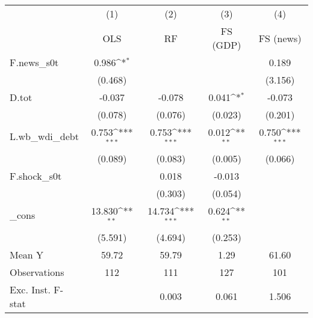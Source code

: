 {
\def\sym#1{\ifmmode^{#1}\else\(^{#1}\)\fi}
\begin{tabular}{l*{4}{c}}
\toprule
            &\multicolumn{1}{c}{(1)}&\multicolumn{1}{c}{(2)}&\multicolumn{1}{c}{(3)}&\multicolumn{1}{c}{(4)}\\
            &\multicolumn{1}{c}{OLS}&\multicolumn{1}{c}{RF}&\multicolumn{1}{c}{FS (GDP)}&\multicolumn{1}{c}{FS (news)}\\
\midrule
F.news\_s0t  &       0.986\sym{*}  &                     &                     &       0.189         \\
            &     (0.468)         &                     &                     &     (3.156)         \\
\addlinespace
D.tot       &      -0.037         &      -0.078         &       0.041\sym{*}  &      -0.073         \\
            &     (0.078)         &     (0.076)         &     (0.023)         &     (0.201)         \\
\addlinespace
L.wb\_wdi\_debt&       0.753\sym{***}&       0.753\sym{***}&       0.012\sym{**} &       0.750\sym{***}\\
            &     (0.089)         &     (0.083)         &     (0.005)         &     (0.066)         \\
\addlinespace
F.shock\_s0t &                     &       0.018         &      -0.013         &                     \\
            &                     &     (0.303)         &     (0.054)         &                     \\
\addlinespace
\_cons      &      13.830\sym{**} &      14.734\sym{***}&       0.624\sym{**} &                     \\
            &     (5.591)         &     (4.694)         &     (0.253)         &                     \\
\midrule
Mean Y      &       59.72         &       59.79         &        1.29         &       61.60         \\
Observations&         112         &         111         &         127         &         101         \\
Exc. Inst. F-stat&                     &       0.003         &       0.061         &       1.506         \\
\bottomrule
\end{tabular}
}
